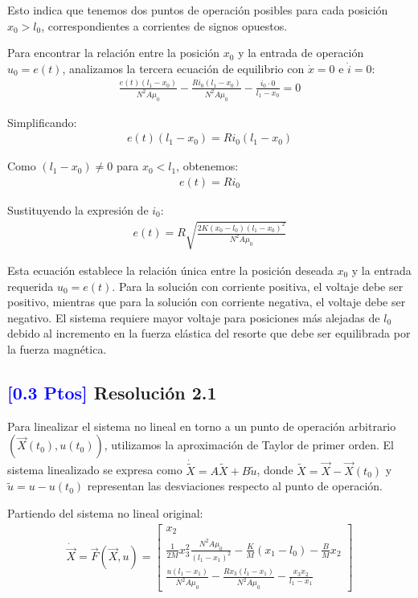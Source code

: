 \documentclass[
  11pt,
  letterpaper,
   addpoints,
   answers
  ]{exam}
\begin{document}
\begin{solution}
Esto indica que tenemos dos puntos de operación posibles para cada posición $x_0 > l_0$, correspondientes a corrientes de signos opuestos.

Para encontrar la relación entre la posición $x_0$ y la entrada de operación $u_0 = e(t)$, analizamos la tercera ecuación de equilibrio con $\dot{x} = 0$ e $\dot{i} = 0$:
\begin{align}
\frac{e(t)(l_1 - x_0)}{N^2 A \mu_0} - \frac{R i_0 (l_1 - x_0)}{N^2 A \mu_0} - \frac{i_0 \cdot 0}{l_1 - x_0} = 0
\end{align}

Simplificando:
\begin{align}
e(t)(l_1 - x_0) = R i_0 (l_1 - x_0)
\end{align}

Como $(l_1 - x_0) \neq 0$ para $x_0 < l_1$, obtenemos:
\begin{align}
e(t) = R i_0
\end{align}

Sustituyendo la expresión de $i_0$:
\begin{align}
\boxed{e(t) = R \sqrt{\frac{2K(x_0 - l_0)(l_1 - x_0)^2}{N^2 A \mu_0}}}
\end{align}

Esta ecuación establece la relación única entre la posición deseada $x_0$ y la entrada requerida $u_0 = e(t)$. Para la solución con corriente positiva, el voltaje debe ser positivo, mientras que para la solución con corriente negativa, el voltaje debe ser negativo. El sistema requiere mayor voltaje para posiciones más alejadas de $l_0$ debido al incremento en la fuerza elástica del resorte que debe ser equilibrada por la fuerza magnética.

\subsection*{\textcolor{blue}{[0.3 Ptos]} Resolución 2.1}

Para linealizar el sistema no lineal en torno a un punto de operación arbitrario $(\vec{X}(t_0), u(t_0))$, utilizamos la aproximación de Taylor de primer orden. El sistema linealizado se expresa como $\dot{\tilde{X}} = A \tilde{X} + B \tilde{u}$, donde $\tilde{X} = \vec{X} - \vec{X}(t_0)$ y $\tilde{u} = u - u(t_0)$ representan las desviaciones respecto al punto de operación.

Partiendo del sistema no lineal original:
\begin{align}
\dot{\vec{X}} = \vec{F}(\vec{X}, u) = \begin{bmatrix}
x_2 \\[4pt]
\displaystyle \frac{1}{2M} x_3^2 \frac{N^2 A \mu_0}{(l_1 - x_1)^2} - \frac{K}{M}(x_1 - l_0) - \frac{B}{M} x_2 \\[8pt]
\displaystyle \frac{u(l_1 - x_1)}{N^2 A \mu_0} - \frac{R x_3 (l_1 - x_1)}{N^2 A \mu_0} - \frac{x_3 x_2}{l_1 - x_1}
\end{bmatrix}
\end{align}


\end{solution}
\end{document}
